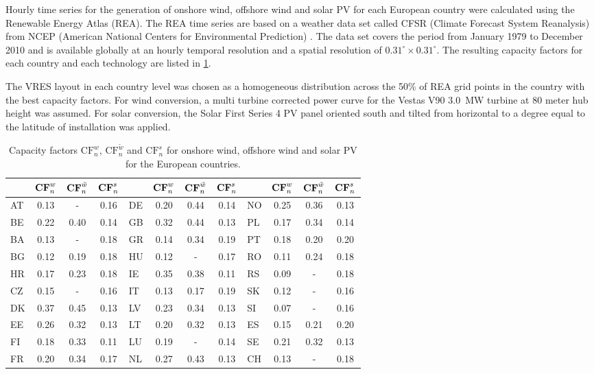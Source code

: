 \documentclass[a4paper, 5p, sort&compress]{elsarticle}%
\begin{document}
Hourly time series for the generation of onshore wind, offshore wind
and solar PV for each European country were calculated using the
Renewable Energy Atlas \cite{REA} (REA). The REA time series are based
on a weather data set called CFSR (Climate Forecast System Reanalysis)
from NCEP (American National Centers for Environmental Prediction)
\cite{Saha}. The data set covers the period from January 1979 to December 2010
and is available globally at an hourly temporal resolution and a
spatial resolution of $0.31^\circ \times 0.31^\circ$. The resulting capacity factors for each country and each technology are listed in \cref{tab:capacity-factors}.

The VRES layout in each country level was chosen as a homogeneous
distribution across the 50\% of REA grid points in the country with
the best capacity factors. For wind conversion, a multi turbine
corrected power curve for the Vestas V90 3.0~MW turbine at 80 meter
hub height was assumed. For solar conversion, the Solar First Series 4
PV panel oriented south and tilted from horizontal to a degree equal
to the latitude of installation was applied.

\begin{table}[t!]
  \caption{Capacity factors $\text{CF}_n^w$, $\text{CF}_n^{\tilde{w}}$ and  $\text{CF}_n^s$ for onshore wind, offshore wind and solar PV for the European countries.}
  \label{tab:capacity-factors}
  \begin{adjustbox}{center}
    \begin{tabular}{lccclccclccc}  \toprule
      & $\text{\textbf{CF}}_n^w$ & $\text{\textbf{CF}}_n^{\tilde{w}}$ & $\text{\textbf{CF}}_n^s$ &  & $\text{\textbf{CF}}_n^w$ &
      $\text{\textbf{CF}}_n^{\tilde{w}}$ & $\text{\textbf{CF}}_n^s$ &  & $\text{\textbf{CF}}_n^w$ & $\text{\textbf{CF}}_n^{\tilde{w}}$ &
      $\text{\textbf{CF}}_n^s$\\ \midrule
      AT & 0.13 & - & 0.16 & DE & 0.20 & 0.44 & 0.14 & NO & 0.25 & 0.36 & 0.13\\
      BE & 0.22 & 0.40 & 0.14 & GB & 0.32 & 0.44 & 0.13 & PL & 0.17 & 0.34 & 0.14\\
      BA & 0.13 & - & 0.18 & GR & 0.14 & 0.34 & 0.19 & PT & 0.18 & 0.20 & 0.20\\
      BG & 0.12 & 0.19 & 0.18 & HU & 0.12 & - & 0.17 & RO & 0.11 & 0.24 & 0.18\\
      HR & 0.17 & 0.23 & 0.18 & IE & 0.35 & 0.38 & 0.11 & RS & 0.09 & - & 0.18\\
      CZ & 0.15 & - & 0.16 & IT & 0.13 & 0.17 & 0.19 & SK & 0.12 & - & 0.16\\
      DK & 0.37 & 0.45 & 0.13 & LV & 0.23 & 0.34 & 0.13 & SI & 0.07 & - & 0.16\\
      EE & 0.26 & 0.32 & 0.13 & LT & 0.20 & 0.32 & 0.13 & ES & 0.15 & 0.21 & 0.20\\
      FI & 0.18 & 0.33 & 0.11 & LU & 0.19 & - & 0.14 & SE & 0.21 & 0.32 & 0.13\\
      FR & 0.20 & 0.34 & 0.17 & NL & 0.27 & 0.43 & 0.13 & CH & 0.13 & - & 0.18\\ \bottomrule
    \end{tabular}
  \end{adjustbox}
\end{table}
\end{document}
